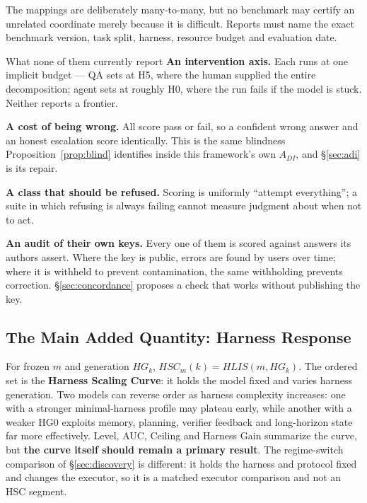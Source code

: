 \documentclass[11pt]{article}
\theoremstyle{definition}
\begin{document}
The mappings are deliberately many-to-many, but no benchmark may certify an unrelated coordinate merely because it is difficult. Reports must name the exact benchmark version, task split, harness, resource budget and evaluation date.

\begin{claimbox}{What none of them currently report}
\textbf{An intervention axis.} Each runs at one implicit budget --- QA sets at H5, where the human supplied the entire decomposition; agent sets at roughly H0, where the run fails if the model is stuck. Neither reports a frontier.

\textbf{A cost of being wrong.} All score pass or fail, so a confident wrong answer and an honest escalation score identically. This is the same blindness Proposition~\ref{prop:blind} identifies inside this framework's own $A_{DI}$, and \S\ref{sec:adi} is its repair.

\textbf{A class that should be refused.} Scoring is uniformly ``attempt everything''; a suite in which refusing is always failing cannot measure judgment about when not to act.

\textbf{An audit of their own keys.} Every one of them is scored against answers its authors assert. Where the key is public, errors are found by users over time; where it is withheld to prevent contamination, the same withholding prevents correction. \S\ref{sec:concordance} proposes a check that works without publishing the key.
\end{claimbox}

\subsection{The Main Added Quantity: Harness Response}

For frozen $m$ and generation $HG_k$, $HSC_m(k) = HLIS(m,HG_k)$. The ordered set is the \textbf{Harness Scaling Curve}: it holds the model fixed and varies harness generation. Two models can reverse order as harness complexity increases: one with a stronger minimal-harness profile may plateau early, while another with a weaker HG0 exploits memory, planning, verifier feedback and long-horizon state far more effectively. Level, AUC, Ceiling and Harness Gain summarize the curve, but \textbf{the curve itself should remain a primary result}. The regime-switch comparison of \S\ref{sec:discovery} is different: it holds the harness and protocol fixed and changes the executor, so it is a matched executor comparison and not an HSC segment.
\end{document}
